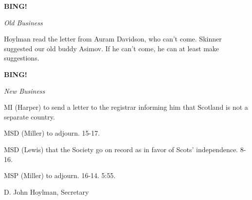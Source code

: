 \documentclass[12pt]{article}
\newcommand{\bing}{{\bf BING!} }
\newcommand{\goto}[1]{\bing \vskip 12pt \centerline{{\em{#1}}}}
\begin{document}
\goto{Old Business}

Hoylman read the letter from Auram Davidson, who can't come. Skinner suggested our old buddy Asimov. If he can't come, he can at least make suggestions.

\goto{New Business}

MI (Harper) to send a letter to the registrar informing him that Scotland is not a separate country.

MSD (Miller) to adjourn. 15-17.

MSD (Lewis) that the Society go on record as in favor of Scots' independence. 8-16.

MSP (Miller) to adjourn. 16-14. 5:55.

\vspace{12pt}

\centerline{D. John Hoylman, Secretary}
\end{document}
